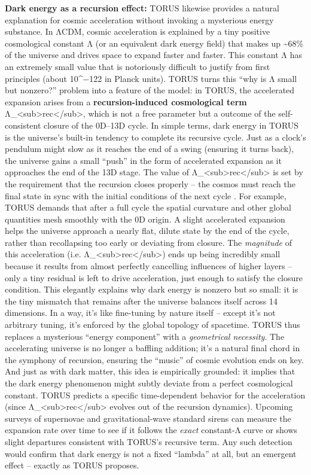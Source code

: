 \textbf{Dark energy as a recursion effect:} TORUS likewise provides a
natural explanation for cosmic acceleration without invoking a
mysterious energy substance. In ΛCDM, cosmic acceleration is explained
by a tiny positive cosmological constant Λ (or an equivalent dark energy
field) that makes up \textasciitilde{}68\% of the universe and drives
space to expand faster and faster. This constant Λ has an extremely
small value that is notoriously difficult to justify from first
principles (about 10\^{}−122 in Planck units)​. TORUS turns this ``why
is Λ small but nonzero?'' problem into a feature of the model: in TORUS,
the accelerated expansion arises from a \textbf{recursion-induced
cosmological term}
Λ\_\textless{}sub\textgreater{}rec\textless{}/sub\textgreater{}, which
is not a free parameter but a outcome of the self-consistent closure of
the 0D--13D cycle​. In simple terms, dark energy in TORUS is the
universe's built-in tendency to complete its recursive cycle. Just as a
clock's pendulum might slow as it reaches the end of a swing (ensuring
it turns back), the universe gains a small ``push'' in the form of
accelerated expansion as it approaches the end of the 13D stage. The
value of Λ\_\textless{}sub\textgreater{}rec\textless{}/sub\textgreater{}
is set by the requirement that the recursion closes properly -- the
cosmos must reach the final state in sync with the initial conditions of
the next cycle​ ​. For example, TORUS demands that after a full cycle
the spatial curvature and other global quantities mesh smoothly with the
0D origin. A slight accelerated expansion helps the universe approach a
nearly flat, dilute state by the end of the cycle, rather than
recollapsing too early or deviating from closure​. The \emph{magnitude}
of this acceleration (i.e.
Λ\_\textless{}sub\textgreater{}rec\textless{}/sub\textgreater{}) ends up
being incredibly small because it results from almost perfectly
cancelling influences of higher layers -- only a tiny residual is left
to drive acceleration, just enough to satisfy the closure condition​.
This elegantly explains why dark energy is nonzero but so small: it is
the tiny mismatch that remains after the universe balances itself across
14 dimensions. In a way, it's like fine-tuning by nature itself --
except it's not arbitrary tuning, it's enforced by the global topology
of spacetime. TORUS thus replaces a mysterious ``energy component'' with
a \emph{geometrical necessity}. The accelerating universe is no longer a
baffling addition; it's a natural final chord in the symphony of
recursion, ensuring the ``music'' of cosmic evolution ends on key. And
just as with dark matter, this idea is empirically grounded: it implies
that the dark energy phenomenon might subtly deviate from a perfect
cosmological constant. TORUS predicts a specific time-dependent behavior
for the acceleration (since
Λ\_\textless{}sub\textgreater{}rec\textless{}/sub\textgreater{} evolves
out of the recursion dynamics)​. Upcoming surveys of supernovae and
gravitational-wave standard sirens can measure the expansion rate over
time to see if it follows the \emph{exact} constant-Λ curve or shows
slight departures consistent with TORUS's recursive term​. Any such
detection would confirm that dark energy is not a fixed ``lambda'' at
all, but an emergent effect -- exactly as TORUS proposes.

